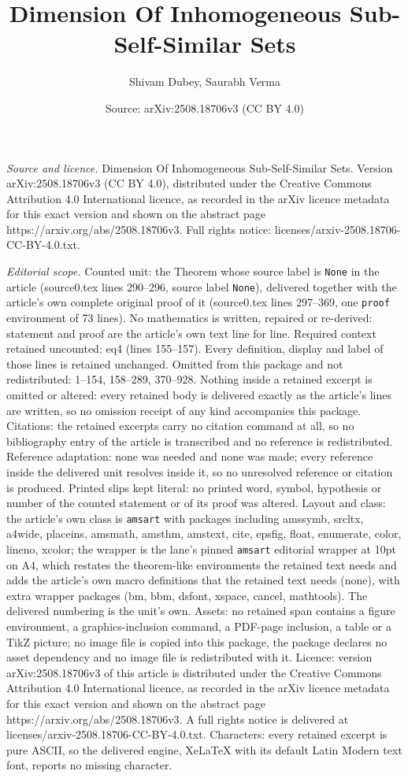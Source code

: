 \documentclass[10pt,a4paper]{amsart}
\title[Dimension Of Inhomogeneous Sub-Self-Similar Sets]{Dimension Of Inhomogeneous Sub-Self-Similar Sets}
\author{Shivam Dubey, Saurabh Verma}
\date{Source: arXiv:2508.18706v3 (CC BY 4.0)}
\begin{document}
\maketitle

\noindent\emph{Source and licence.} Dimension Of Inhomogeneous Sub-Self-Similar Sets. Version arXiv:2508.18706v3 (CC BY 4.0), distributed under the Creative Commons Attribution 4.0 International licence, as recorded in the arXiv licence metadata for this exact version and shown on the abstract page https://arxiv.org/abs/2508.18706v3. Full rights notice: licenses/arxiv-2508.18706-CC-BY-4.0.txt.\par\smallskip

\noindent\textit{Editorial scope.} Counted unit: the Theorem whose source label is \texttt{None} in the article (source0.tex lines 290--296, source label \texttt{None}), delivered together with the article's own complete original proof of it (source0.tex lines 297--369, one \texttt{proof} environment of 73 lines). No mathematics is written, repaired or re-derived: statement and proof are the article's own text line for line. Required context retained uncounted: eq4 (lines 155--157). Every definition, display and label of those lines is retained unchanged. Omitted from this package and not redistributed: 1--154, 158--289, 370--928. Nothing inside a retained excerpt is omitted or altered: every retained body is delivered exactly as the article's lines are written, so no omission receipt of any kind accompanies this package. Citations: the retained excerpts carry no citation command at all, so no bibliography entry of the article is transcribed and no reference is redistributed. Reference adaptation: none was needed and none was made; every reference inside the delivered unit resolves inside it, so no unresolved reference or citation is produced. Printed slips kept literal: no printed word, symbol, hypothesis or number of the counted statement or of its proof was altered. Layout and class: the article's own class is \texttt{amsart} with packages including amssymb, srcltx, a4wide, placeins, amsmath, amsthm, amstext, cite, epsfig, float, enumerate, color, lineno, xcolor; the wrapper is the lane's pinned \texttt{amsart} editorial wrapper at 10pt on A4, which restates the theorem-like environments the retained text needs and adds the article's own macro definitions that the retained text needs (none), with extra wrapper packages (bm, bbm, dsfont, xspace, cancel, mathtools). The delivered numbering is the unit's own. Assets: no retained span contains a figure environment, a graphics-inclusion command, a PDF-page inclusion, a table or a TikZ picture; no image file is copied into this package, the package declares no asset dependency and no image file is redistributed with it. Licence: version arXiv:2508.18706v3 of this article is distributed under the Creative Commons Attribution 4.0 International licence, as recorded in the arXiv licence metadata for this exact version and shown on the abstract page https://arxiv.org/abs/2508.18706v3. A full rights notice is delivered at licenses/arxiv-2508.18706-CC-BY-4.0.txt. Characters: every retained excerpt is pure ASCII, so the delivered engine, XeLaTeX with its default Latin Modern text font, reports no missing character.
\end{document}
